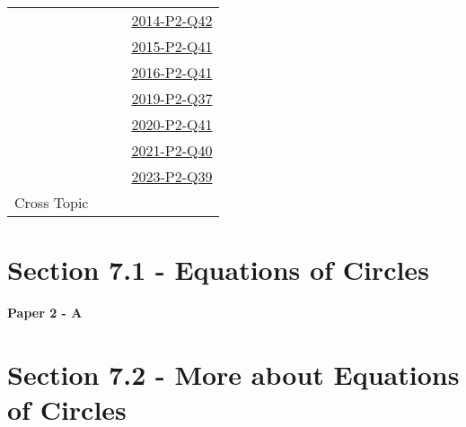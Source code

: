 \documentclass[12pt, a4paper]{article}
\begin{document}
\begin{absolutelynopagebreak}
\begin{center}
\begin{tabular}{|l|c|c|c|}
&  &  & \hyperref[DSE2014-CoreP2-Q42]{2014-P2-Q42} \\
&  &  & \hyperref[DSE2015-CoreP2-Q41]{2015-P2-Q41} \\
&  &  & \hyperref[DSE2016-CoreP2-Q41]{2016-P2-Q41} \\
&  &  & \hyperref[DSE2019-CoreP2-Q37]{2019-P2-Q37} \\
&  &  & \hyperref[DSE2020-CoreP2-Q41]{2020-P2-Q41} \\
&  &  & \hyperref[DSE2021-CoreP2-Q40]{2021-P2-Q40} \\
&  &  & \hyperref[DSE2023-CoreP2-Q39]{2023-P2-Q39} \\
\hline
\hline
Cross Topic&  &  &  \\
\hline
\end{tabular}
\end{center}
\end{absolutelynopagebreak}




\section*{Section 7.1 - Equations of Circles}\label{section:5-7-1}

\textbf{Paper 2 - A}
\begin{enumx}[label=\arabic*.,start=1]
\item {}\label{DSE2014-CoreP2-Q26} 
\item {}\label{DSE2015-CoreP2-Q26} 
\end{enumx}




\section*{Section 7.2 - More about Equations of Circles}\label{section:5-7-2}
\end{document}
